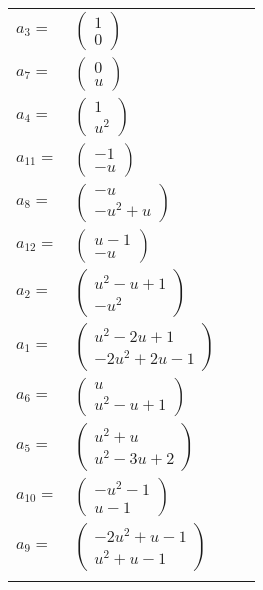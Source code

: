 \documentclass[1p]{elsarticle_modified}
\theoremstyle{definition}
\begin{document}
\begin{tabular}{m{7pt} m{180pt} m{7pt} m{180pt} }
\flushright $a_{3}=$&$\begin{pmatrix}1\\0\end{pmatrix}$ \\
\flushright $a_{7}=$&$\begin{pmatrix}0\\u\end{pmatrix}$ \\
\flushright $a_{4}=$&$\begin{pmatrix}1\\u^2\end{pmatrix}$ \\
\flushright $a_{11}=$&$\begin{pmatrix}-1\\- u\end{pmatrix}$ \\
\flushright $a_{8}=$&$\begin{pmatrix}- u\\- u^2+u\end{pmatrix}$ \\
\flushright $a_{12}=$&$\begin{pmatrix}u-1\\- u\end{pmatrix}$ \\
\flushright $a_{2}=$&$\begin{pmatrix}u^2- u+1\\- u^2\end{pmatrix}$ \\
\flushright $a_{1}=$&$\begin{pmatrix}u^2-2 u+1\\-2 u^2+2 u-1\end{pmatrix}$ \\
\flushright $a_{6}=$&$\begin{pmatrix}u\\u^2- u+1\end{pmatrix}$ \\
\flushright $a_{5}=$&$\begin{pmatrix}u^2+u\\u^2-3 u+2\end{pmatrix}$ \\
\flushright $a_{10}=$&$\begin{pmatrix}- u^2-1\\u-1\end{pmatrix}$ \\
\flushright $a_{9}=$&$\begin{pmatrix}-2 u^2+u-1\\u^2+u-1\end{pmatrix}$\\&\end{tabular}
\end{document}
